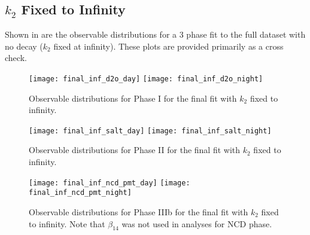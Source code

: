 \clearpage

\subsection{\texorpdfstring{$k_2$}{k2} Fixed to Infinity}

Shown in  are the observable distributions for a 3 phase fit to the full dataset with no decay ($k_2$ fixed at infinity). These plots are provided primarily as a cross check.

\begin{figure}
\centering
\texttt{[image: final\_inf\_d2o\_day]}
\texttt{[image: final\_inf\_d2o\_night]}
\caption{\label{fig:final_inf_d2o_obs}Observable distributions for Phase I for the final fit with $k_2$ fixed to infinity.}
\end{figure}
\begin{figure}
\centering
\texttt{[image: final\_inf\_salt\_day]}
\texttt{[image: final\_inf\_salt\_night]}
\caption{\label{fig:final_inf_salt_obs}Observable distributions for Phase II for the final fit with $k_2$ fixed to infinity.}
\end{figure}
\begin{figure}
\centering
\texttt{[image: final\_inf\_ncd\_pmt\_day]}
\texttt{[image: final\_inf\_ncd\_pmt\_night]}
\caption{\label{fig:final_inf_ncd_pmt_obs}Observable distributions for Phase IIIb for the final fit with $k_2$ fixed to infinity. Note that $\beta_{14}$ was not used in analyses for NCD phase.}
\end{figure}
